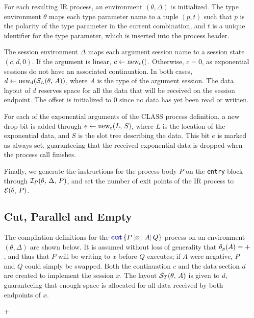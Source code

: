 For each resulting \ac{IR} process, an environment $(\theta, \Delta)$ is initialized. The type environment $\theta$ maps each type parameter name to a tuple $(p, t)$ such that $p$ is the polarity of the type parameter in the current combination, and $t$ is a unique identifier for the type parameter, which is inserted into the process header.

The session environment $\Delta$ maps each argument session name to a session state $(c, d, 0)$. If the argument is linear, $c \leftarrow \text{new}_{\text{c}}()$. Otherwise, $c = 0$, as exponential sessions do not have an associated continuation. In both cases, $d \leftarrow \text{new}_{\text{d}}(\mathcal{S}_L(\theta,\,A))$, where $A$ is the type of the argument session. The data layout of $d$ reserves space for all the data that will be received on the session endpoint. The offset is initialized to $0$ since no data has yet been read or written.

For each of the exponential arguments of the \ac{CLASS} process definition, a new drop bit is added through $e \leftarrow \text{new}_{\text{e}}(L,\,S)$, where $L$ is the location of the exponential data, and $S$ is the slot tree describing the data. This bit $e$ is marked as always set, guaranteeing that the received exponential data is dropped when the process call finishes.

Finally, we generate the instructions for the process body $P$ on the \texttt{entry} block through $\mathcal{I}_P(\theta,\,\Delta,\,P)$, and set the number of exit points of the \ac{IR} process to $\mathcal{E}(\theta,\,P)$.

\subsection{Cut, Parallel and Empty}

The compilation definitions for the $\cutc{P}{x:A}{Q}$ process on an environment $(\theta, \Delta)$ are shown below. It is assumed without loss of generality that $\theta_{p}(A) = +$, and thus that $P$ will be writing to $x$ before $Q$ executes; if $A$ were negative, $P$ and $Q$ could simply be swapped. Both the continuation $c$ and the data section $d$ are created to implement the session $x$. The layout $\mathcal{S}_T(\theta,\,A)$ is given to $d$, guaranteeing that enough space is allocated for all data received by both endpoints of $x$.
\begin{compilation}{\theta}{\Delta}{}
{ + }
\end{compilation}

